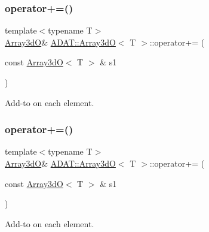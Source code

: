 \subsubsection{\texorpdfstring{operator+=()}{operator+=()}\hspace{0.1cm}{\footnotesize\ttfamily [2/6]}}
{\footnotesize\ttfamily template$<$typename T$>$ \\
\mbox{\hyperlink{classADAT_1_1Array3dO}{Array3dO}}\& \mbox{\hyperlink{classADAT_1_1Array3dO}{A\+D\+A\+T\+::\+Array3dO}}$<$ T $>$\+::operator+= (\begin{DoxyParamCaption}\item[{const \mbox{\hyperlink{classADAT_1_1Array3dO}{Array3dO}}$<$ T $>$ \&}]{s1 }\end{DoxyParamCaption})\hspace{0.3cm}{\ttfamily [inline]}}



Add-\/to on each element. 

\mbox{\label{classADAT_1_1Array3dO_a5d72c8e7dd54897fe898b07616123229}} 
\subsubsection{\texorpdfstring{operator+=()}{operator+=()}\hspace{0.1cm}{\footnotesize\ttfamily [3/6]}}
{\footnotesize\ttfamily template$<$typename T$>$ \\
\mbox{\hyperlink{classADAT_1_1Array3dO}{Array3dO}}\& \mbox{\hyperlink{classADAT_1_1Array3dO}{A\+D\+A\+T\+::\+Array3dO}}$<$ T $>$\+::operator+= (\begin{DoxyParamCaption}\item[{const \mbox{\hyperlink{classADAT_1_1Array3dO}{Array3dO}}$<$ T $>$ \&}]{s1 }\end{DoxyParamCaption})\hspace{0.3cm}{\ttfamily [inline]}}



Add-\/to on each element. 

\mbox{\label{classADAT_1_1Array3dO_a6e5f624a1a14555b030d5fb53cb85f9c}} 

